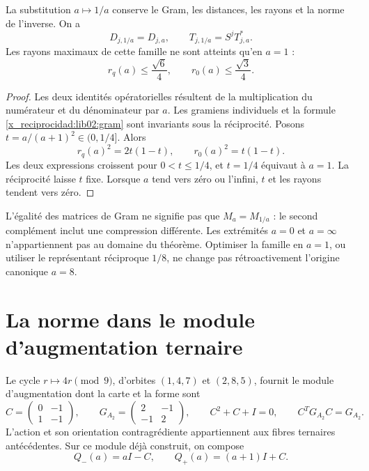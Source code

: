 \begin{proposition}
\label{x_reciprocidad:lib02:dualidad-a}
La substitution \(a\mapsto1/a\) conserve le Gram, les distances,
les rayons et la norme de l’inverse. On a
\[
 D_{j,1/a}=D_{j,a},\qquad
 T_{j,1/a}=S^jT_{j,a}^*.
\]
Les rayons maximaux de cette famille ne sont atteints qu'en \(a=1\) :
\[
 r_q(a)\leq\frac{\sqrt6}{4},\qquad
 r_0(a)\leq\frac{\sqrt3}{4}.
\]
\end{proposition}
\begin{proof}
Les deux identités opératorielles résultent de la multiplication du numérateur et du
dénominateur par \(a\). Les gramiens individuels et la formule
\eqref{x_reciprocidad:lib02:gram} sont invariants sous la réciprocité. Posons
\(t=a/(a+1)^2\in(0,1/4]\). Alors
\[
 r_q(a)^2=2t(1-t),\qquad r_0(a)^2=t(1-t).
\]
Les deux expressions croissent pour \(0<t\leq1/4\), et \(t=1/4\)
équivaut à \(a=1\). La réciprocité laisse \(t\) fixe. Lorsque
\(a\) tend vers zéro ou l’infini, \(t\) et les rayons tendent vers zéro.
\end{proof}

L'égalité des matrices de Gram ne signifie pas que \(M_a=M_{1/a}\) : le second complément inclut une compression différente. Les extrémités \(a=0\) et \(a=\infty\) n'appartiennent pas au domaine du théorème. Optimiser la famille en \(a=1\), ou utiliser le représentant réciproque \(1/8\), ne change pas rétroactivement l'origine canonique \(a=8\).

\section{La norme dans le module d’augmentation ternaire}
\label{x_reciprocidad:lib02:modulo-ternario}

Le cycle \(r\mapsto4r\pmod9\), d’orbites \((1,4,7)\) et
\((2,8,5)\), fournit le module d’augmentation dont la carte et la forme sont
\[
 C=\begin{pmatrix}0&-1\\1&-1\end{pmatrix},\qquad
 G_{A_2}=\begin{pmatrix}2&-1\\-1&2\end{pmatrix},\qquad
 C^2+C+I=0,\qquad C^TG_{A_2}C=G_{A_2}.
\]
L’action et son orientation contragrédiente appartiennent aux fibres
ternaires antécédentes. Sur ce module déjà construit, on compose
\[
 Q_-(a)=aI-C,\qquad Q_+(a)=(a+1)I+C.
\]

